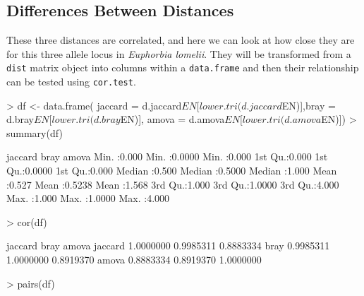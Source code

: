 \documentclass[letterpaper,twoside,openany]{book}
\begin{document}
\subsection{Differences Between Distances}

These three distances are correlated, and here we can look at how close they are for this three allele locus in \emph{Euphorbia lomelii}.  They will be transformed from a \texttt{dist} matrix object into columns within a \texttt{data.frame} and then their relationship can be tested using \texttt{cor.test}.

\begin{Schunk}
\begin{Sinput}
> df <- data.frame( jaccard = d.jaccard$EN[lower.tri(d.jaccard$EN)],bray = d.bray$EN[lower.tri(d.bray$EN)], amova = d.amova$EN[lower.tri(d.amova$EN)])
> summary(df)
\end{Sinput}
\begin{Soutput}
    jaccard           bray            amova      
 Min.   :0.000   Min.   :0.0000   Min.   :0.000  
 1st Qu.:0.000   1st Qu.:0.0000   1st Qu.:0.000  
 Median :0.500   Median :0.5000   Median :1.000  
 Mean   :0.527   Mean   :0.5238   Mean   :1.568  
 3rd Qu.:1.000   3rd Qu.:1.0000   3rd Qu.:4.000  
 Max.   :1.000   Max.   :1.0000   Max.   :4.000  
\end{Soutput}
\begin{Sinput}
> cor(df)
\end{Sinput}
\begin{Soutput}
          jaccard      bray     amova
jaccard 1.0000000 0.9985311 0.8883334
bray    0.9985311 1.0000000 0.8919370
amova   0.8883334 0.8919370 1.0000000
\end{Soutput}
\begin{Sinput}
> pairs(df)
\end{Sinput}
\end{Schunk}
\end{document}
